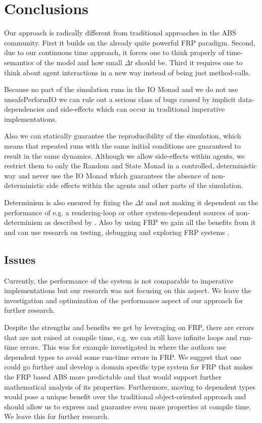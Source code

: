 \section{Conclusions}
\label{sec:conclusions}

Our approach is radically different from traditional approaches in the ABS community. First it builds on the already quite powerful FRP paradigm. Second, due to our continuous time approach, it forces one to think properly of time-semantics of the model and how small $\Delta t$ should be. Third it requires one to think about agent interactions in a new way instead of being just method-calls.

Because no part of the simulation runs in the IO Monad and we do not use unsafePerformIO we can rule out a serious class of bugs caused by implicit data-dependencies and side-effects which can occur in traditional imperative implementations.

Also we can statically guarantee the reproducibility of the simulation, which means that repeated runs with the same initial conditions are guaranteed to result in the same dynamics. Although we allow side-effects within agents, we restrict them to only the Random and State Monad in a controlled, deterministic way and never use the IO Monad which guarantees the absence of non-deterministic side effects within the agents and other parts of the simulation.

Determinism is also ensured by fixing the $\Delta t$ and not making it dependent on the performance of e.g. a rendering-loop or other system-dependent sources of non-determinism as described by \cite{perez_testing_2017}. Also by using FRP we gain all the benefits from it and can use research on testing, debugging and exploring FRP systems \cite{perez_testing_2017, perez_back_2017}.

\subsection*{Issues}
Currently, the performance of the system is not comparable to imperative implementations but our research was not focusing on this aspect. We leave the investigation and optimization of the performance aspect of our approach for further research.

Despite the strengths and benefits we get by leveraging on FRP, there are errors that are not raised at compile time, e.g. we can still have infinite loops and run-time errors. This was for example investigated in \cite{sculthorpe_safe_2009} where the authors use dependent types to avoid some run-time errors in FRP. We suggest that one could go further and develop a domain specific type system for FRP that makes the FRP based ABS more predictable and that would support further mathematical analysis of its properties. Furthermore, moving to dependent types would pose a unique benefit over the traditional object-oriented approach and should allow us to express and guarantee even more properties at compile time. We leave this for further research.

